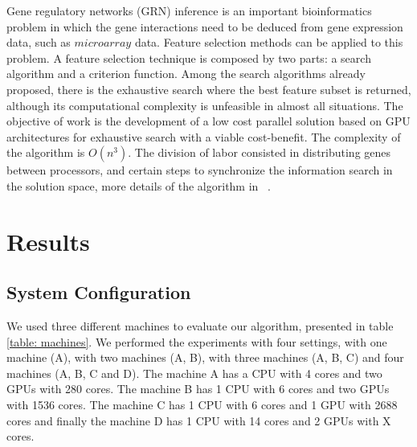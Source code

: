 \documentclass[journal]{IEEEtran}
\begin{document}
Gene regulatory networks (GRN) inference is an important bioinformatics problem in which the gene interactions need to be deduced from gene expression data, such as $microarray$ data. Feature selection methods can be applied to this problem. A feature selection technique is composed by two parts: a search algorithm and a criterion function. Among the search algorithms already proposed, there is the exhaustive search where the best
feature subset is returned, although its computational complexity is unfeasible in almost all situations. The objective of work is the development of a low cost parallel solution based on GPU architectures for exhaustive search with a viable cost-benefit. The complexity of the algorithm is $O(n^3)$. The division of labor consisted in distributing genes between processors, and certain steps to synchronize the information search in the solution space, more details of the algorithm in ~\cite{borelli2013gene}.




\section{Results}


\subsection{System Configuration}

We used three different machines to evaluate our algorithm, presented in table \ref{table: machines}. We performed the experiments with four settings, with one machine (A), with two machines (A, B), with three machines (A, B, C) and four machines (A, B, C and D). The machine A has a CPU with 4 cores and two GPUs with 280 cores. The machine B has 1 CPU with 6 cores and two GPUs with 1536 cores. The machine C has 1 CPU with 6 cores and 1 GPU with 2688 cores and finally the machine D has 1 CPU with 14 cores and 2 GPUs with X cores. 
\end{document}
